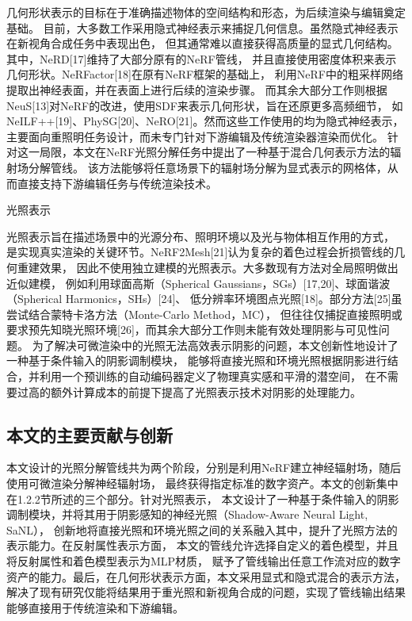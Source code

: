几何形状表示的目标在于准确描述物体的空间结构和形态，为后续渲染与编辑奠定基础。
目前，大多数工作采用隐式神经表示来捕捉几何信息。虽然隐式神经表示在新视角合成任务中表现出色，
但其通常难以直接获得高质量的显式几何结构。其中，NeRD[17]维持了大部分原有的NeRF管线，
并且直接使用密度体积来表示几何形状。NeRFactor[18]在原有NeRF框架的基础上，
利用NeRF中的粗采样网络提取出神经表面，并在表面上进行后续的渲染步骤。
而其余大部分工作则根据NeuS[13]对NeRF的改进，使用SDF来表示几何形状，旨在还原更多高频细节，
如NeILF++[19]、PhySG[20]、NeRO[21]。然而这些工作使用的均为隐式神经表示，
主要面向重照明任务设计，而未专门针对下游编辑及传统渲染器渲染而优化。
针对这一局限，本文在NeRF光照分解任务中提出了一种基于混合几何表示方法的辐射场分解管线。
该方法能够将任意场景下的辐射场分解为显式表示的网格体，从而直接支持下游编辑任务与传统渲染技术。

光照表示

光照表示旨在描述场景中的光源分布、照明环境以及光与物体相互作用的方式，
是实现真实渲染的关键环节。NeRF2Mesh[21]认为复杂的着色过程会折损管线的几何重建效果，
因此不使用独立建模的光照表示。大多数现有方法对全局照明做出近似建模，
例如利用球面高斯（Spherical Gaussians，SGs）[17,20]、球面谐波（Spherical Harmonics，SHs）[24]、
低分辨率环境图点光照[18]。部分方法[25]虽尝试结合蒙特卡洛方法（Monte-Carlo Method，MC），
但往往仅捕捉直接照明或要求预先知晓光照环境[26]，而其余大部分工作则未能有效处理阴影与可见性问题。
为了解决可微渲染中的光照无法高效表示阴影的问题，本文创新性地设计了一种基于条件输入的阴影调制模块，
能够将直接光照和环境光照根据阴影进行结合，并利用一个预训练的自动编码器定义了物理真实感和平滑的潜空间，
在不需要过高的额外计算成本的前提下提高了光照表示技术对阴影的处理能力。

\subsection{本文的主要贡献与创新}

本文设计的光照分解管线共为两个阶段，分别是利用NeRF建立神经辐射场，随后使用可微渲染分解神经辐射场，
最终获得指定标准的数字资产。本文的创新集中在1.2.2节所述的三个部分。针对光照表示，
本文设计了一种基于条件输入的阴影调制模块，并将其用于阴影感知的神经光照（Shadow-Aware Neural Light, SaNL），
创新地将直接光照和环境光照之间的关系融入其中，提升了光照方法的表示能力。在反射属性表示方面，
本文的管线允许选择自定义的着色模型，并且将反射属性和着色模型表示为MLP材质，
赋予了管线输出任意工作流对应的数字资产的能力。最后，在几何形状表示方面，本文采用显式和隐式混合的表示方法，
解决了现有研究仅能将结果用于重光照和新视角合成的问题，实现了管线输出结果能够直接用于传统渲染和下游编辑。

